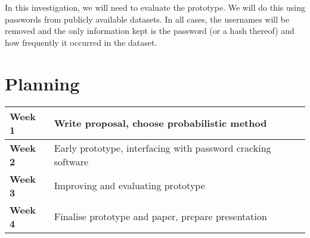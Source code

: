 \documentclass{article}
\begin{document}
In this investigation, we will need to evaluate the prototype. We will do this
using passwords from publicly available datasets. In all cases, the usernames
will be removed and the only information kept is the password (or a hash
thereof) and how frequently it occurred in the dataset.


\section{Planning}

\begin{tabular}{ | l | l | }
\hline {\bf Week 1} & Write proposal, choose probabilistic method \\
\hline {\bf Week 2} & Early prototype, interfacing with password cracking software \\
\hline {\bf Week 3} & Improving and evaluating prototype \\
\hline {\bf Week 4} & Finalise prototype and paper, prepare presentation \\
\hline
\end{tabular}


\printbibliography
\end{document}
